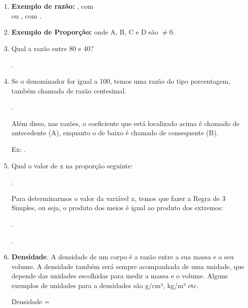 \begin{multicols*}{2}
			\begin{enumerate}
			
			\item \textbf{Exemplo de razão:}  , com\\
			
				 ou , com .
			
			\item \textbf{Exemplo de Proporção:} 	onde A, B, C e D são $\neq 0$.
			
			\item Qual a razão entre 80 e 40? 
			
			.
			
			\item Se o denominador for igual a 100, temos uma razão do tipo porcentagem, também chamada de razão centesimal.
			
			.
			
			Além disso, nas razões, o coeficiente que está localizado acima é chamado de antecedente (A), enquanto o de baixo é chamado de consequente (B).
			
			Ex: .
			
			\item Qual o valor de x na proporção seguinte:
			
			.
			
			Para determinarmos o valor da variável x, temos que fazer a Regra de 3 Simples, ou seja, o produto dos meios é igual ao produto dos extremos:
			
			.
			
			.
			
			\item \textbf{Densidade}. A densidade de um corpo é a razão entre a sua massa e o seu volume. A densidade também será sempre acompanhada de uma unidade, que depende das unidades escolhidas para medir a massa e o volume. Alguns exemplos de unidades para a densidades são g/cm³, kg/m³ etc.

Densidade = \\


\end{enumerate}
\end{multicols*}

